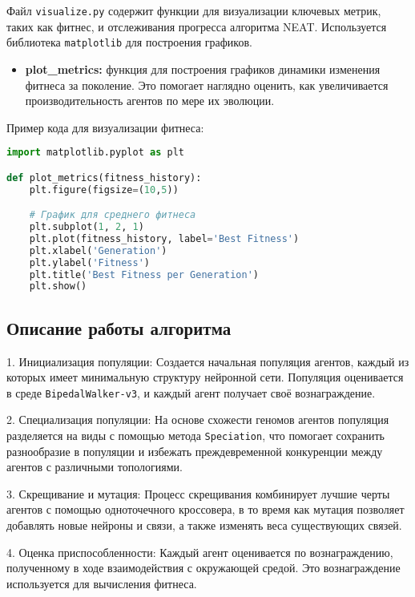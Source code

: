 \documentclass[a4paper,12pt]{article}
\begin{document}
Файл \texttt{visualize.py} содержит функции для визуализации ключевых метрик, таких как фитнес, и отслеживания прогресса алгоритма NEAT. Используется библиотека \texttt{matplotlib} для построения графиков.

\begin{itemize}
    \item \textbf{plot\_metrics:} функция для построения графиков динамики изменения фитнеса за поколение. Это помогает наглядно оценить, как увеличивается производительность агентов по мере их эволюции.
\end{itemize}

Пример кода для визуализации фитнеса:

\begin{lstlisting}[language=Python]
import matplotlib.pyplot as plt

def plot_metrics(fitness_history):
    plt.figure(figsize=(10,5))

    # График для среднего фитнеса
    plt.subplot(1, 2, 1)
    plt.plot(fitness_history, label='Best Fitness')
    plt.xlabel('Generation')
    plt.ylabel('Fitness')
    plt.title('Best Fitness per Generation')
    plt.show()
\end{lstlisting}

\subsection{Описание работы алгоритма}

1. Инициализация популяции: Создается начальная популяция агентов, каждый из которых имеет минимальную структуру нейронной сети. Популяция оценивается в среде \texttt{BipedalWalker-v3}, и каждый агент получает своё вознаграждение.

2. Специализация популяции: На основе схожести геномов агентов популяция разделяется на виды с помощью метода \texttt{Speciation}, что помогает сохранить разнообразие в популяции и избежать преждевременной конкуренции между агентов с различными топологиями.

3. Скрещивание и мутация: Процесс скрещивания комбинирует лучшие черты агентов с помощью одноточечного кроссовера, в то время как мутация позволяет добавлять новые нейроны и связи, а также изменять веса существующих связей.

4. Оценка приспособленности: Каждый агент оценивается по вознаграждению, полученному в ходе взаимодействия с окружающей средой. Это вознаграждение используется для вычисления фитнеса.
\end{document}
